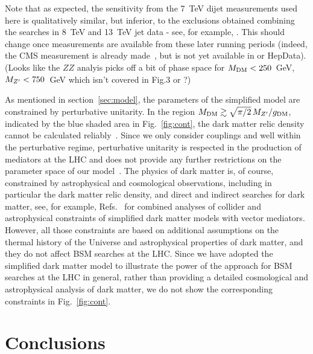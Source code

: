 \documentclass[floatfix]{article}
\begin{document}
Note that as expected, the sensitivity from the 7~TeV dijet measurements used here is qualitatively similar, but inferior, to the exclusions obtained 
combining the searches in 8~TeV and 13~TeV jet data - see, for example, \cite{Fairbairn:2016iuf}. This should change once measurements
are available from these later running periods (indeed, the CMS measurement is already made~\cite{Khachatryan:2016wdh}, but is not yet available in \rivet or HepData).
(Looks like the $ZZ$ analyis picks off a bit of phase space for $M_{\rm DM} < 250$~GeV, $M_{Z^{\prime}} < 750$~GeV which isn't covered in Fig.3 or \cite{Fairbairn:2016iuf}?) 

As mentioned in section~\ref{sec:model},  the parameters of the simplified model are constrained by perturbative unitarity. 
In the region $M_{\rm DM} \gtrsim \sqrt{\pi/2}\, M_{Z^{\prime}}/g_{\rm DM}$, indicated by the blue shaded area in Fig.~\ref{fig:cont}, 
the dark matter relic density cannot be calculated reliably~\cite{Kahlhoefer:2015bea}. Since we only consider couplings \GDM and \GQ well within the perturbative regime, perturbative unitarity is respected in the production of mediators at the LHC 
and does not provide any further restrictions on the parameter space of our model~\cite{Englert:2016joy}. The physics of dark matter is, of course, constrained by astrophysical and cosmological observations, including in particular the dark matter relic density, and direct and indirect searches for dark matter, see, for example, Refs.~\cite{Kahlhoefer:2015bea, Heisig:2015ira,Jacques:2016dqz} for combined analyses of collider and astrophysical constraints of simplified dark matter models with vector mediators. However, all those constraints are based on additional assumptions on the thermal history of the Universe and astrophysical properties of dark matter, and they do not affect BSM searches at the LHC. Since we have adopted the simplified dark matter model to illustrate the power of the \Contur approach for BSM searches at the LHC in general, rather than providing a detailed cosmological and astrophysical analysis of dark matter, we do not show the corresponding constraints in Fig.~\ref{fig:cont}.

\section{Conclusions}\label{sec:conclusions}
\end{document}
